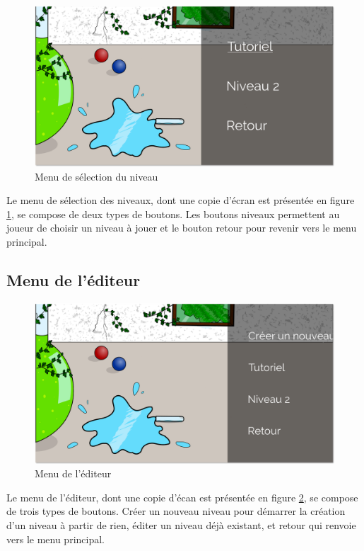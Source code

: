 \begin{figure}[h]
    \centering
    \includegraphics[width=13cm]{figures/manuel-menu-jouer.png}
    \caption{Menu de sélection du niveau}
    \label{fig:manuel-menu-selection}
\end{figure}

Le menu de sélection des niveaux, dont une copie d'écran est présentée
en figure \ref{fig:manuel-menu-selection}, se compose de deux types de boutons.
Les boutons niveaux permettent au joueur de choisir un niveau à jouer et
le bouton retour pour revenir vers le menu principal.

\subsection{Menu de l'éditeur}

\begin{figure} [!h]
    \centering
    \includegraphics[width=13cm]{figures/manuel-menu-editeur.png}
    \caption{Menu de l'éditeur}
    \label{fig:manuel-menu-editeur}
\end{figure}

Le menu de l'éditeur, dont une copie d'écan est présentée en figure
\ref{fig:manuel-menu-editeur}, se compose de trois types de boutons.
Créer un nouveau niveau pour démarrer la création d'un niveau à partir
de rien, éditer un niveau déjà existant, et retour qui renvoie vers
le menu principal.

